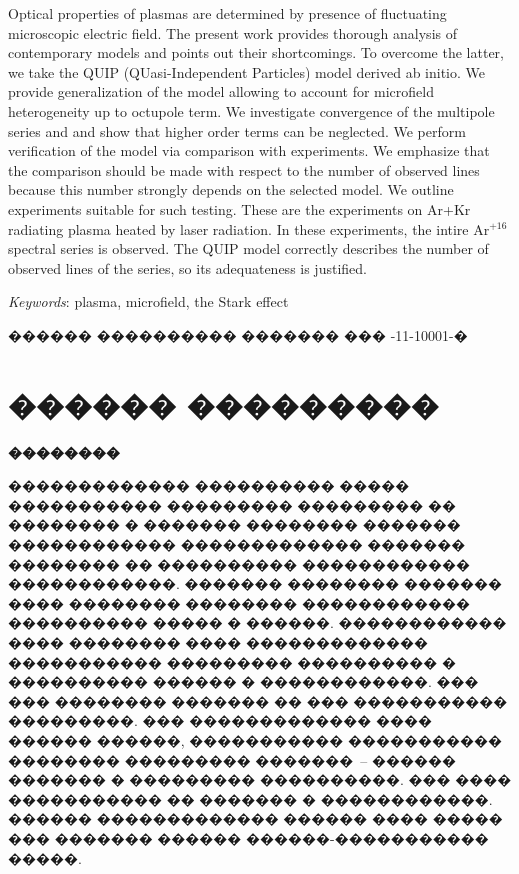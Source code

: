 \documentclass[12pt,titlepage]{article}
\newcommand{\No}{\textnumero}
\begin{document}
\medskip

Optical properties of plasmas are determined by presence of fluctuating microscopic electric field. The present work provides thorough analysis of contemporary models and points out their shortcomings. To overcome the latter, we take the QUIP (QUasi-Independent Particles) model derived ab initio. We provide generalization of the model allowing to account for microfield heterogeneity up to octupole term. We investigate convergence of the multipole series and  and show that higher order terms can be neglected. We perform verification of the model via comparison with experiments. We emphasize that the comparison should be made with respect to the number of observed lines because this number strongly depends on the selected model. We outline experiments suitable for such testing. These are the experiments on Ar+Kr radiating plasma heated by laser radiation. In these experiments, the intire Ar$^{+16}$ spectral series is observed. The QUIP model correctly describes the number of observed lines of the series, so its adequateness is justified.

\medskip

\noindent \textit{Keywords}: plasma, microfield, the Stark effect

\bigskip

������ ���������� ������� ��� \No 16-11-10001-�


\pagebreak



\setcounter{page}{3}

\section{������ ���������}

\textbf{��������}

������������� ���������� ����� ����������� ��������� ��������� �� �������� � ������� �������� ������� ������������ ������������� ������� �������� �� ���������� ������������ ������������. ������� �������� ������� ���� �������� �������� ������������ ���������� ����� � ������. ������������ ���� �������� ���� ������������� ����������� ��������� ���������� � ���������� ������ � ������������. ��� ��� �������� ������� �� ��� ����������� ���������. ��� ������������� ���� ������ ������, ����������� ����������� �������� ��������� �������~-- ������ ������� � ��������� ����������. ��� ���� ����������� �� ������� � ������������. ������ ������������� ������ ���� ����� ��� ������� ������ ������-����������� �����.
\end{document}
